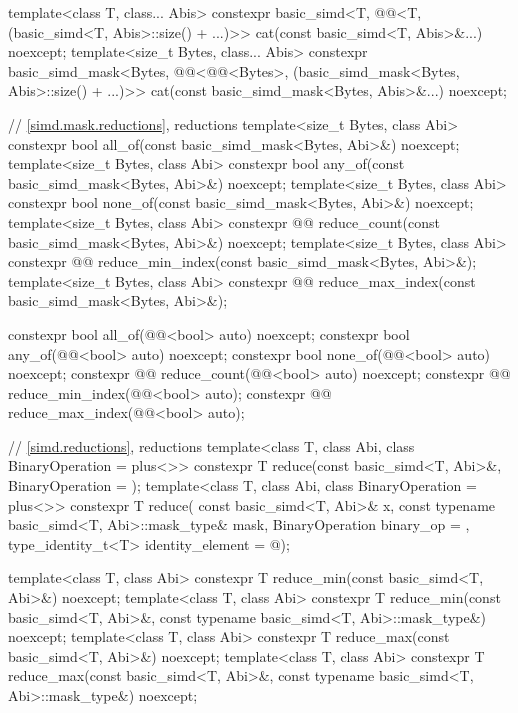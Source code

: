 \begin{codeblock}
{  template<class T, class... Abis>
    constexpr basic_simd<T, @@<T, (basic_simd<T, Abis>::size() + ...)>>
      cat(const basic_simd<T, Abis>&...) noexcept;
  template<size_t Bytes, class... Abis>
    constexpr basic_simd_mask<Bytes, @@<@@<Bytes>,
                              (basic_simd_mask<Bytes, Abis>::size() + ...)>>
      cat(const basic_simd_mask<Bytes, Abis>&...) noexcept;

  // \ref{simd.mask.reductions},  reductions
  template<size_t Bytes, class Abi>
    constexpr bool all_of(const basic_simd_mask<Bytes, Abi>&) noexcept;
  template<size_t Bytes, class Abi>
    constexpr bool any_of(const basic_simd_mask<Bytes, Abi>&) noexcept;
  template<size_t Bytes, class Abi>
    constexpr bool none_of(const basic_simd_mask<Bytes, Abi>&) noexcept;
  template<size_t Bytes, class Abi>
    constexpr @@ reduce_count(const basic_simd_mask<Bytes, Abi>&) noexcept;
  template<size_t Bytes, class Abi>
    constexpr @@ reduce_min_index(const basic_simd_mask<Bytes, Abi>&);
  template<size_t Bytes, class Abi>
    constexpr @@ reduce_max_index(const basic_simd_mask<Bytes, Abi>&);

  constexpr bool all_of(@@<bool> auto) noexcept;
  constexpr bool any_of(@@<bool> auto) noexcept;
  constexpr bool none_of(@@<bool> auto) noexcept;
  constexpr @@ reduce_count(@@<bool> auto) noexcept;
  constexpr @@ reduce_min_index(@@<bool> auto);
  constexpr @@ reduce_max_index(@@<bool> auto);

  // \ref{simd.reductions},  reductions
  template<class T, class Abi, class BinaryOperation = plus<>>
    constexpr T reduce(const basic_simd<T, Abi>&, BinaryOperation = {});
  template<class T, class Abi, class BinaryOperation = plus<>>
    constexpr T reduce(
      const basic_simd<T, Abi>& x, const typename basic_simd<T, Abi>::mask_type& mask,
      BinaryOperation binary_op = {}, type_identity_t<T> identity_element = @\seebelow@);

  template<class T, class Abi>
    constexpr T reduce_min(const basic_simd<T, Abi>&) noexcept;
  template<class T, class Abi>
    constexpr T reduce_min(const basic_simd<T, Abi>&,
                           const typename basic_simd<T, Abi>::mask_type&) noexcept;
  template<class T, class Abi>
    constexpr T reduce_max(const basic_simd<T, Abi>&) noexcept;
  template<class T, class Abi>
    constexpr T reduce_max(const basic_simd<T, Abi>&,
                           const typename basic_simd<T, Abi>::mask_type&) noexcept;

}
\end{codeblock}
